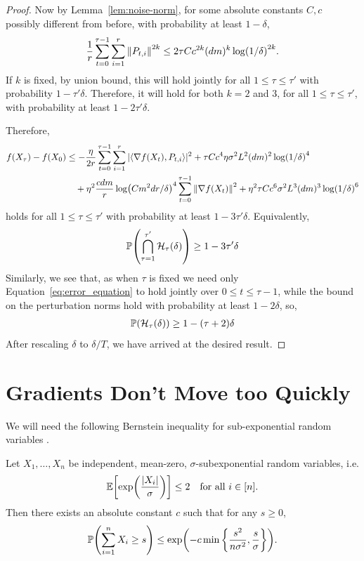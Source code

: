 \begin{proof}
Now by Lemma~\ref{lem:noise-norm}, for some absolute constants $C,c$ possibly different from before, with probability at least $1-\delta$,
\begin{align*}
    \frac{1}{r} \sum_{t=0}^{\tau-1} \sum_{i=1}^r \mg{P_{t,i}}^{2k} \leq 2\tau Cc^{2k} (dm)^k \log(1/\delta)^{2k}.
\end{align*}
If $k$ is fixed, by union bound, this will hold jointly for all $1 \leq \tau \leq \tau'$ with probability $1-\tau' \delta$. Therefore, it will hold for both $k=2$ and $3$, for all $1 \leq \tau \leq \tau'$, with probability at least $1-2\tau'\delta$. 

Therefore,
\begin{align*}
    f(X_{\tau}) - f(X_0) &\leq -\frac{\eta}{2r} \sum_{t=0}^{\tau-1} \sum_{i=1}^r |\langle \grad f(X_t), P_{t,i} \rangle|^2 + \tau C c^4 \eta \sigma^2 L^2(dm)^2 \log(1/\delta)^4 \\
    &\quad + \eta^2 \frac{cdm}{r} \log(Cm^2 dr/\delta)^4 \sum_{t=0}^{\tau-1} \mg{\grad f(X_t)}^2 + \eta^2 \tau C c^6  \sigma^2 L^3 (dm)^3 \log(1/\delta)^6
\end{align*}
    holds for all $1 \leq \tau \leq \tau'$ with probability at least $1-3 \tau' \delta$.
Equivalently,
\begin{align*}
    \P(\bigcap_{\tau=1}^{\tau'} \mathcal H_\tau(\delta)) \geq 1-3\tau' \delta
\end{align*}
Similarly, we see that, as when $\tau$ is fixed we need only Equation~\ref{eq:error_equation} to hold jointly over $0 \leq t \leq \tau-1$, while the bound on the perturbation norms hold with probability at least $1-2\delta$, so,
\begin{align*}
    \P(\mathcal H_\tau(\delta)) \geq 1 - (\tau+2)\delta
\end{align*}
After rescaling $\delta$ to $\delta/T$, we have arrived at the desired result.
\end{proof}

\section{Gradients Don't Move too Quickly}

We will need the following Bernstein inequality for sub-exponential random variables \citep[Theorem~2.8.1]{vershynin2018high}.
\begin{lemma}
    Let $X_1, \ldots, X_n$ be independent, mean-zero, $\sigma$-subexponential random variables, i.e.
    \begin{align*}
        \E[\exp(\frac{|X_i|}{\sigma})] \leq 2 \quad \text{for all $i \in [n]$}.
    \end{align*}
    Then there exists an absolute constant $c$ such that for any $s \geq 0$,
    \begin{align*}
        \P(\sum_{i=1}^n X_i \geq s) \leq \exp(-c \min\set{\frac{s^2}{n\sigma^2}, \frac s \sigma}).
    \end{align*}
\end{lemma}

